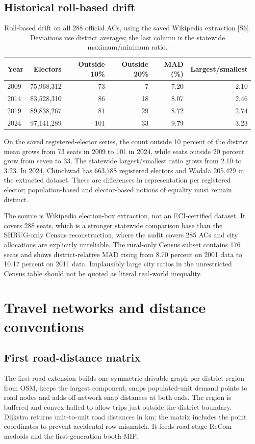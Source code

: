 \documentclass[11pt,a4paper,oneside]{report}
\newcommand{\source}[1]{\par\nopagebreak[4]{\footnotesize\color{teal}Evidence: #1.}\par}
\begin{document}
\section{Historical roll-based drift}
\begin{table}[htbp]\centering
\small
\setlength{\tabcolsep}{5pt}
\caption{Roll-based drift on all 288 official ACs, using the saved Wikipedia extraction [S6]. Deviations use district averages; the last column is the statewide maximum/minimum ratio.}
\begin{tabular}{lrrrrr}
\toprule
Year & Electors & Outside 10\% & Outside 20\% & MAD (\%) & Largest/smallest\\
\midrule
2009 & 75,968,312 & 73 & 7 & 7.20 & 2.10\\
2014 & 83,528,310 & 86 & 18 & 8.07 & 2.46\\
2019 & 89,838,267 & 81 & 29 & 8.72 & 2.74\\
2024 & 97,141,289 & 101 & 33 & 9.79 & 3.23\\
\bottomrule\end{tabular}
\end{table}
On the saved registered-elector series, the count outside 10 percent of the district mean grows from 73 seats in 2009 to 101 in 2024, while seats outside 20 percent grow from seven to 33. The statewide largest/smallest ratio grows from 2.10 to 3.23. In 2024, Chinchwad has 663,788 registered electors and Wadala 205,429 in the extracted dataset. These are differences in representation per registered elector; population-based and elector-based notions of equality must remain distinct.

The source is Wikipedia election-box extraction, not an ECI-certified dataset. It covers 288 seats, which is a stronger statewide comparison base than the SHRUG-only Census reconstruction, where the audit covers 285 ACs and city allocations are explicitly unreliable. The rural-only Census subset contains 176 seats and shows district-relative MAD rising from 8.70 percent on 2001 data to 10.17 percent on 2011 data. Implausibly large city ratios in the unrestricted Census table should not be quoted as literal real-world inequality.
\source{[S5], [S6]}

\chapter{Travel networks and distance conventions}
\section{First road-distance matrix}
The first road extension builds one symmetric drivable graph per district region from OSM, keeps the largest component, snaps populated-unit demand points to road nodes and adds off-network snap distances at both ends. The region is buffered and convex-hulled to allow trips just outside the district boundary. Dijkstra returns unit-to-unit road distances in km; the matrix includes the point coordinates to prevent accidental row mismatch. It feeds road-stage ReCom medoids and the first-generation booth MIP.
\end{document}
